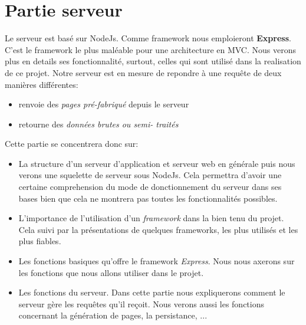 \chapter{Partie serveur}
Le serveur est basé sur NodeJs. Comme framework nous emploieront \textbf{Express}. C'est le framework le plus maléable pour une architecture en MVC. Nous verons plus en details ses fonctionnalité, surtout, celles qui sont utilisé dans la realisation de ce projet.
Notre serveur est en mesure de repondre à une requête de deux manières différentes:
\begin{itemize}
	\item renvoie des \textit{pages pré-fabriqué} depuis le serveur
	\item retourne des \textit{données brutes ou semi- traités}
\end{itemize}
Cette partie se concentrera donc sur:
\begin{itemize}
	\item La structure d'un serveur d'application et serveur web en générale puis nous verons une squelette de serveur sous NodeJs. Cela permettra d'avoir une certaine comprehension du mode de donctionnement du serveur dans ses bases bien que cela ne montrera pas toutes les fonctionnalités possibles.
	\item L'importance de l'utilisation d'un \textit{framework} dans la bien tenu du projet. Cela suivi par la présentations de quelques frameworks, les plus utilisés et les plus fiables.
	\item Les fonctions basiques qu'offre le framework \textit{Express}. Nous nous axerons sur les fonctions que nous allons utiliser dans le projet.
	\item Les fonctions du serveur. Dans cette partie nous expliquerons comment le serveur gère les requêtes qu'il reçoit. Nous verons aussi les fonctions concernant la génération de pages, la persistance, ...
\end{itemize}


